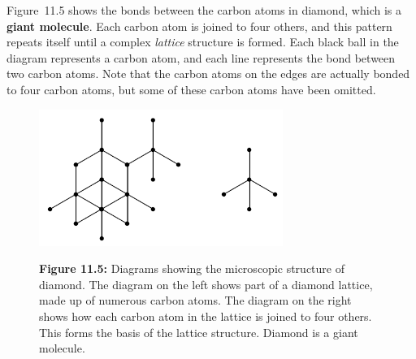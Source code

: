 \begin{enumerate}[noitemsep, label=\textbf{\arabic*}. ]
Figure~11.5 shows the bonds between the carbon atoms in diamond, 
which is a \textbf{giant molecule}. Each carbon atom 
is joined to four others, and this pattern repeats itself until a complex 
\textsl{lattice} structure is formed. Each black 
ball in the diagram represents a carbon atom, and each line represents the bond 
between two carbon atoms. Note that the carbon atoms on the edges are actually 
bonded to four carbon atoms, but some of these carbon atoms have been omitted.

    \setcounter{subfigure}{0}


	\begin{figure}[H] %
    \begin{center}
    \label{m38120*uid10!!!underscore!!!media}\label{m38120*uid10!!!underscore!!!printimage}\includegraphics[width=300px]{col11305.imgs/m38120_CG10C2_005.png} %
        
      \vspace{2pt}
    \vspace{\rubberspace}\par \begin{cnxcaption}
	  \small \textbf{Figure 11.5: }Diagrams showing the microscopic 
structure of diamond. The diagram on the left shows part of a diamond lattice, 
made up of numerous carbon atoms. The diagram on the right shows how each carbon 
atom in the lattice is joined to four others. This forms the basis of the 
lattice structure. Diamond is a giant molecule.
	\end{cnxcaption}
      
    \vspace{.1in}
    
    \end{center}

 \end{figure}   

    \addtocounter{footnote}{-0}
    \end{enumerate}
        
